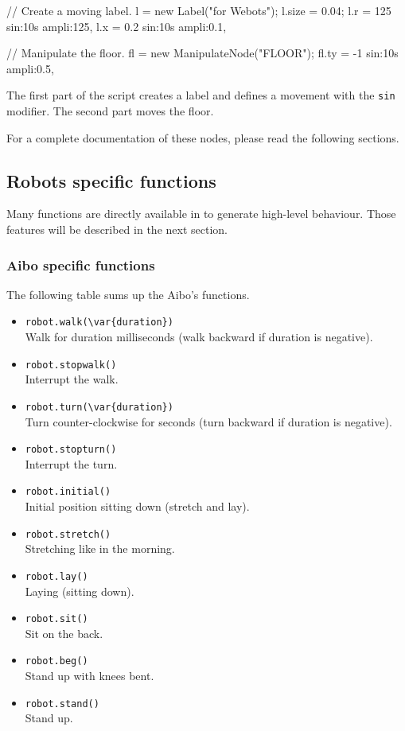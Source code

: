 \begin{urbifixme}
// Create a moving label.
l = new Label("\urbi for Webots");
l.size = 0.04;
l.r = 125 sin:10s ampli:125,
l.x = 0.2 sin:10s ampli:0.1,

// Manipulate the floor.
fl = new ManipulateNode("FLOOR");
fl.ty = -1 sin:10s ampli:0.5,
\end{urbifixme}

The first part of the script creates a label and defines a movement
with the \lstinline|sin| modifier. The second part moves the floor.

For a complete documentation of these nodes, please read the following
sections.

\subsection{Robots specific functions}
\label{webots.builtin.robots}%

Many functions are directly available in \us to generate high-level
behaviour. Those features will be described in the next section.


\subsubsection{Aibo specific functions}
\label{webots.builtin.robots.aibo}%

The following table sums up the Aibo's functions.

\begin{itemize}
\item \lstinline|robot.walk(\var{duration})|\\
  Walk for duration milliseconds (walk backward if duration is negative).
\item \lstinline|robot.stopwalk()|\\
  Interrupt the walk.
\item \lstinline|robot.turn(\var{duration})|\\
  Turn counter-clockwise for  seconds (turn backward if
  duration is negative).
\item \lstinline|robot.stopturn()|\\
  Interrupt the turn.
\item \lstinline|robot.initial()|\\
  Initial position sitting down (stretch and lay).
\item \lstinline|robot.stretch()|\\
  Stretching like in the morning.
\item \lstinline|robot.lay()|\\
  Laying (sitting down).
\item \lstinline|robot.sit()|\\
  Sit on the back.
\item \lstinline|robot.beg()|\\
  Stand up with knees bent.
\item \lstinline|robot.stand()|\\
  Stand up.
\end{itemize}

